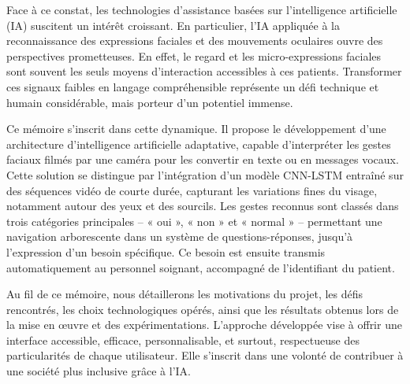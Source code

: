 \documentclass[
]{article}
\begin{document}
Face à ce constat, les technologies d'assistance basées sur l'intelligence artificielle (IA) suscitent un intérêt croissant. En particulier, l'IA appliquée à la reconnaissance des expressions faciales et des mouvements oculaires ouvre des perspectives prometteuses. En effet, le regard et les micro-expressions faciales sont souvent les seuls moyens d'interaction accessibles à ces patients. Transformer ces signaux faibles en langage compréhensible représente un défi technique et humain considérable, mais porteur d'un potentiel immense.

Ce mémoire s'inscrit dans cette dynamique. Il propose le développement d'une architecture d'intelligence artificielle adaptative, capable d'interpréter les gestes faciaux filmés par une caméra pour les convertir en texte ou en messages vocaux. Cette solution se distingue par l'intégration d'un modèle CNN-LSTM entraîné sur des séquences vidéo de courte durée, capturant les variations fines du visage, notamment autour des yeux et des sourcils. Les gestes reconnus sont classés dans trois catégories principales -- « oui », « non » et « normal » {}-- permettant une navigation arborescente dans un système de questions-réponses, jusqu'à l'expression d'un besoin spécifique. Ce besoin est ensuite transmis automatiquement au personnel soignant, accompagné de l'identifiant du patient.

Au fil de ce mémoire, nous détaillerons les motivations du projet, les défis rencontrés, les choix technologiques opérés, ainsi que les résultats obtenus lors de la mise en œuvre et des expérimentations. L'approche développée vise à offrir une interface accessible, efficace, personnalisable, et surtout, respectueuse des particularités de chaque utilisateur. Elle s'inscrit dans une volonté de contribuer à une société plus inclusive grâce à l'IA.{}

\hypertarget{section-26}{%
\subsection{}\label{section-26}}

\hypertarget{section-27}{%
\subsection{}\label{section-27}}

\hypertarget{section-28}{%
\subsection{}\label{section-28}}
\end{document}
